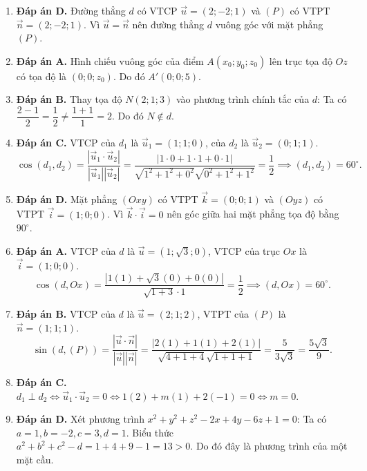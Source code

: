 \documentclass[12pt,a4paper]{article}
\begin{document}
\begin{enumerate}
\item \textbf{Đáp án D.}  
Đường thẳng $d$ có VTCP $\vec{u} = (2; -2; 1)$ và $(P)$ có VTPT $\vec{n} = (2; -2; 1)$.  
Vì $\vec{u} = \vec{n}$ nên đường thẳng $d$ vuông góc với mặt phẳng $(P)$.

\item \textbf{Đáp án A.}  
Hình chiếu vuông góc của điểm $A(x_0; y_0; z_0)$ lên trục tọa độ $Oz$ có tọa độ là $(0; 0; z_0)$. Do đó $A'(0; 0; 5)$.

\item \textbf{Đáp án B.}  
Thay tọa độ $N(2; 1; 3)$ vào phương trình chính tắc của $d$:  
Ta có $\dfrac{2 - 1}{2} = \dfrac{1}{2} \ne \dfrac{1 + 1}{1} = 2$. Do đó $N \notin d$.

\item \textbf{Đáp án C.}  
VTCP của $d_1$ là $\vec{u}_1 = (1; 1; 0)$, của $d_2$ là $\vec{u}_2 = (0; 1; 1)$.
\[
\cos(d_1, d_2) = \dfrac{|\vec{u}_1 \cdot \vec{u}_2|}{|\vec{u}_1||\vec{u}_2|} = \dfrac{|1\cdot 0 + 1\cdot 1 + 0\cdot 1|}{\sqrt{1^2 + 1^2 + 0^2}\sqrt{0^2 + 1^2 + 1^2}} = \dfrac{1}{2} \implies (d_1, d_2) = 60^\circ.
\]

\item \textbf{Đáp án D.}  
Mặt phẳng $(Oxy)$ có VTPT $\vec{k} = (0; 0; 1)$ và $(Oyz)$ có VTPT $\vec{i} = (1; 0; 0)$.  
Vì $\vec{k} \cdot \vec{i} = 0$ nên góc giữa hai mặt phẳng tọa độ bằng $90^\circ$.

\item \textbf{Đáp án A.}  
VTCP của $d$ là $\vec{u} = (1; \sqrt{3}; 0)$, VTCP của trục $Ox$ là $\vec{i} = (1; 0; 0)$.
\[
\cos(d, Ox) = \dfrac{|1(1) + \sqrt{3}(0) + 0(0)|}{\sqrt{1 + 3}\cdot 1} = \dfrac{1}{2} \implies (d, Ox) = 60^\circ.
\]

\item \textbf{Đáp án B.}  
VTCP của $d$ là $\vec{u} = (2; 1; 2)$, VTPT của $(P)$ là $\vec{n} = (1; 1; 1)$.
\[
\sin(d, (P)) = \dfrac{|\vec{u} \cdot \vec{n}|}{|\vec{u}||\vec{n}|} = \dfrac{|2(1) + 1(1) + 2(1)|}{\sqrt{4 + 1 + 4}\sqrt{1 + 1 + 1}} = \dfrac{5}{3\sqrt{3}} = \dfrac{5\sqrt{3}}{9}.
\]

\item \textbf{Đáp án C.}  
$d_1 \perp d_2 \iff \vec{u}_1 \cdot \vec{u}_2 = 0 \iff 1(2) + m(1) + 2(-1) = 0 \iff m = 0$.

\item \textbf{Đáp án D.}  
Xét phương trình $x^2 + y^2 + z^2 - 2x + 4y - 6z + 1 = 0$:  
Ta có $a = 1, b = -2, c = 3, d = 1$.  
Biểu thức $a^2 + b^2 + c^2 - d = 1 + 4 + 9 - 1 = 13 > 0$. Do đó đây là phương trình của một mặt cầu.


\end{enumerate}
\end{document}
